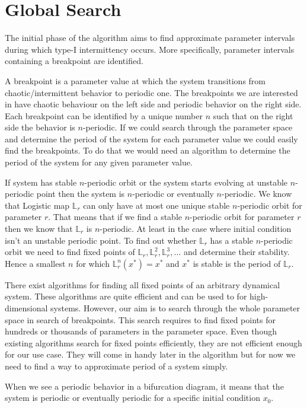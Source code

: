 \section{Global Search}
The initial phase of the algorithm aims to find approximate parameter intervals during which type-I intermittency occurs.
More specifically, parameter intervals containing a breakpoint are identified.
\par
A breakpoint is a parameter value at which the system transitions from chaotic/intermittent behavior to periodic one.
The breakpoints we are interested in have chaotic behaviour on the left side and periodic behavior on the right side.
Each breakpoint can be identified by a unique number $n$ such that on the right side the behavior is $n$-periodic.
If we could search through the parameter space and determine the period of the system for each parameter value we could easily find the breakpoints.
To do that we would need an algorithm to determine the period of the system for any given parameter value.
\par
If system has stable $n$-periodic orbit or the system starts evolving at unstable $n$-periodic point then the system is $n$-periodic or eventually $n$-periodic.
We know that Logistic map $\mathbb{L}_r$ can only have at most one unique stable $n$-periodic orbit for parameter $r$.
That means that if we find a stable $n$-periodic orbit for parameter $r$ then we know that $\mathbb{L}_r$ is $n$-periodic.
At least in the case where initial condition isn't an unstable periodic point.
To find out whether $\mathbb{L}_r$ has a stable $n$-periodic orbit we need to find fixed points of $\mathbb{L}_r, \mathbb{L}_{r}^{2}, \mathbb{L}_{r}^{3}, \dots$ and determine their stability.
Hence a smallest $n$ for which $\mathbb{L}_{r}^{n}(x^{*})=x^{*}$ and $x^{*}$ is stable is the period of $\mathbb{L}_r$.
\par
There exist algorithms for finding all fixed points of an arbitrary dynamical system.
These algorithms are quite efficient and can be used to for high-dimensional systems.
However, our aim is to search through the whole parameter space in search of breakpoints.
This search requires to find fixed points for hundreds or thousands of parameters in the parameter space.
Even though existing algorithms search for fixed points efficiently, they are not efficient enough for our use case.
They will come in handy later in the algorithm but for now we need to find a way to approximate period of a system simply.
\par
When we see a periodic behavior in a bifurcation diagram, it means that the system is periodic or eventually periodic for a specific initial condition $x_0$.
